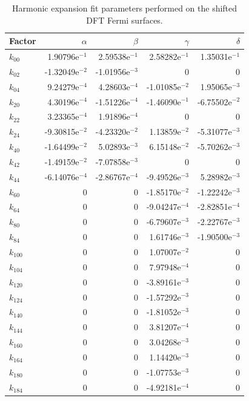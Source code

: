 \begin{table}
    \caption{Harmonic expansion fit parameters performed on the shifted \ac{DFT} Fermi surfaces.}
    \label{Tab:ResD:HarmonicParams}
    \begin{center}
{\small
    \begin{tabular}[htbp]{lrrrr}
\toprule
Factor	& $\alpha$	& $\beta$	& $\gamma$	& $\delta$	\\
\midrule
$k_{00}$	&  1.90796e$^{-1}$	&  2.59538e$^{-1}$	&  2.58282e$^{-1}$	&  1.35031e$^{-1}$	\\
$k_{02}$	& -1.32049e$^{-2}$	& -1.01956e$^{-3}$	&  0		& 0		\\
$k_{04}$	&  9.24279e$^{-4}$	&  4.28603e$^{-4}$	& -1.01085e$^{-2}$	&  1.95065e$^{-3}$	\\
$k_{20}$	&  4.30196e$^{-4}$	& -1.51226e$^{-4}$	& -1.46090e$^{-1}$	& -6.75502e$^{-2}$	\\
$k_{22}$	&  3.23365e$^{-4}$	&  1.91896e$^{-4}$	&  0		& 0		\\
$k_{24}$	& -9.30815e$^{-2}$	& -4.23320e$^{-2}$	&  1.13859e$^{-2}$	& -5.31077e$^{-3}$	\\
$k_{40}$	& -1.64499e$^{-2}$	&  5.02893e$^{-3}$	&  6.15148e$^{-2}$	& -5.70262e$^{-3}$	\\
$k_{42}$	& -1.49159e$^{-2}$	& -7.07858e$^{-3}$	&  0		& 0		\\
$k_{44}$	& -6.14076e$^{-4}$	& -2.86767e$^{-4}$	& -9.49526e$^{-3}$	&  5.28982e$^{-3}$	\\
$k_{60}$	& 0		& 0		& -1.85170e$^{-2}$	& -1.22242e$^{-3}$	\\
$k_{64}$	& 0		& 0		& -9.04247e$^{-4}$	& -2.82851e$^{-4}$	\\
$k_{80}$	& 0		& 0		& -6.79607e$^{-3}$	& -2.22767e$^{-3}$	\\
$k_{84}$	& 0		& 0		&  1.61746e$^{-3}$	& -1.90500e$^{-3}$	\\
$k_{100}$	& 0		& 0		&  1.07007e$^{-2}$	& 0		\\
$k_{104}$	& 0		& 0		&  7.97948e$^{-4}$	& 0		\\
$k_{120}$	& 0		& 0		& -3.89161e$^{-3}$	& 0		\\
$k_{124}$	& 0		& 0		& -1.57292e$^{-3}$	& 0		\\
$k_{140}$	& 0		& 0		& -1.81052e$^{-3}$	& 0		\\
$k_{144}$	& 0		& 0		&  3.81207e$^{-4}$	& 0		\\
$k_{160}$	& 0		& 0		&  3.04268e$^{-3}$	& 0		\\
$k_{164}$	& 0		& 0		&  1.14420e$^{-3}$	& 0		\\
$k_{180}$	& 0		& 0		& -1.07753e$^{-3}$	& 0		\\
$k_{184}$	& 0		& 0		& -4.92181e$^{-4}$	& 0		\\
\bottomrule
    \end{tabular}
}
    \end{center}
\end{table}

